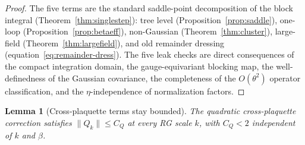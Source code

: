 \documentclass[11pt]{article}
\newtheorem{lemma}[theorem]{Lemma}
\theoremstyle{definition}
\begin{document}
\begin{proof}
The five terms are the standard saddle-point decomposition
of the block integral (Theorem~\ref{thm:singlestep}):
tree level (Proposition~\ref{prop:saddle}), one-loop
(Proposition~\ref{prop:betaeff}), non-Gaussian
(Theorem~\ref{thm:cluster}), large-field
(Theorem~\ref{thm:largefield}), and old remainder dressing
(equation~\eqref{eq:remainder-dress}).  The five leak
checks are direct consequences of the compact integration
domain, the gauge-equivariant blocking map, the
well-definedness of the Gaussian covariance, the
completeness of the $O(\theta^2)$ operator classification,
and the $\eta$-independence of normalization factors.
\end{proof}

\begin{lemma}[Cross-plaquette terms stay bounded]%
\label{lem:Q-bounded}
The quadratic cross-plaquette correction satisfies
$\|Q_k\|\le C_Q$ at every RG scale $k$,
with $C_Q<2$ independent of $k$ and $\beta$.
\end{lemma}
\end{document}
